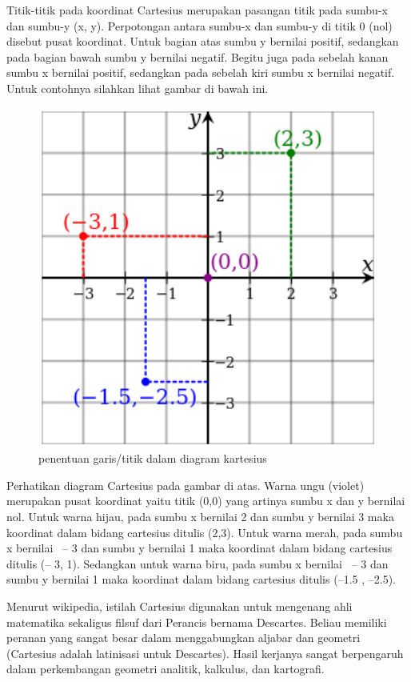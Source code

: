 Titik-titik pada koordinat Cartesius merupakan pasangan titik pada sumbu-x dan sumbu-y (x, y). Perpotongan antara sumbu-x dan sumbu-y di titik 0 (nol) disebut pusat koordinat. Untuk bagian atas sumbu y bernilai positif, sedangkan pada bagian bawah sumbu y bernilai negatif. Begitu juga pada sebelah kanan sumbu x bernilai positif, sedangkan pada sebelah kiri sumbu x bernilai negatif. Untuk contohnya silahkan lihat gambar di bawah ini. 
\begin{figure}[ht]
	\centerline{\includegraphics[width=1\textwidth]{figures/cau100.PNG}}
	\caption{penentuan garis/titik dalam diagram kartesius}
	\label{cau100}
	\end{figure}

Perhatikan diagram Cartesius pada gambar di atas. Warna ungu (violet) merupakan pusat koordinat yaitu titik (0,0) yang artinya sumbu x dan y bernilai nol. Untuk warna hijau, pada sumbu x bernilai 2 dan sumbu y bernilai 3 maka koordinat dalam bidang cartesius ditulis (2,3). Untuk warna merah, pada sumbu x bernilai  – 3 dan sumbu y bernilai 1 maka koordinat dalam bidang cartesius ditulis (– 3, 1). Sedangkan untuk warna biru, pada sumbu x bernilai  – 3 dan sumbu y bernilai 1 maka koordinat dalam bidang cartesius ditulis (–1.5 , –2.5).

Menurut wikipedia, istilah Cartesius digunakan untuk mengenang ahli matematika sekaligus filsuf dari Perancis bernama Descartes. Beliau memiliki peranan yang sangat besar dalam menggabungkan aljabar dan geometri (Cartesius adalah latinisasi untuk Descartes). Hasil kerjanya sangat berpengaruh dalam perkembangan geometri analitik, kalkulus, dan kartografi.


